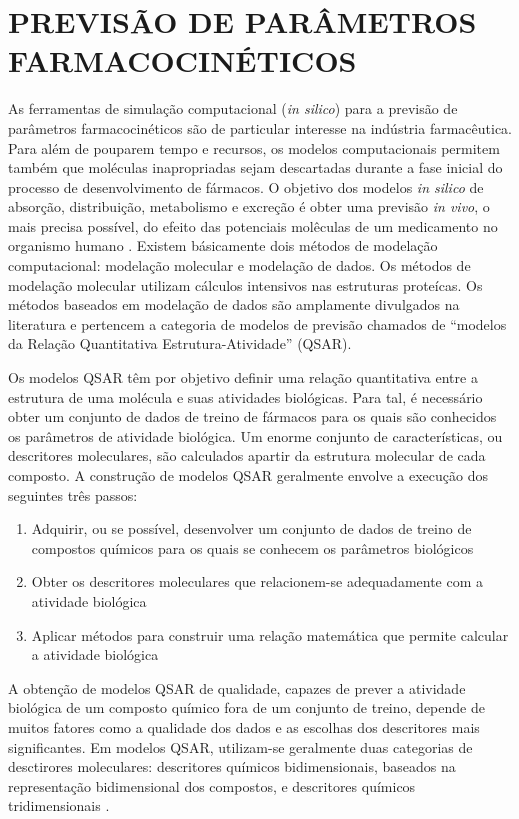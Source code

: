 \section{PREVISÃO DE PARÂMETROS FARMACOCINÉTICOS}
\label{sec:3previsao}

As ferramentas de simulação computacional (\emph{in silico}) para a previsão de parâmetros farmacocinéticos são de particular interesse na
indústria farmacêutica. Para além de pouparem tempo e recursos, os modelos computacionais permitem também que moléculas inapropriadas
sejam descartadas durante a fase inicial do processo de desenvolvimento de fármacos. O objetivo dos modelos \emph{in silico} de absorção, distribuição,
metabolismo e excreção é obter uma previsão \emph{in vivo}, o mais precisa possível, do efeito das potenciais molêculas de um medicamento no 
organismo humano \citep{waterbeemd2003,madan2012prediction}. Existem básicamente dois métodos de modelação computacional: 
modelação molecular e modelação de dados. Os métodos de modelação molecular 
utilizam cálculos intensivos nas estruturas proteícas. Os métodos baseados em modelação de dados são amplamente divulgados na literatura e 
pertencem a categoria de modelos de previsão chamados de ``modelos da Relação Quantitativa Estrutura-Atividade'' (\ac{QSAR}).

Os modelos \ac{QSAR} têm por objetivo definir uma relação quantitativa entre a estrutura de uma molécula e suas atividades biológicas.
Para tal, é necessário obter um conjunto de dados de treino de fármacos para os quais são conhecidos os parâmetros de atividade biológica.
Um enorme conjunto de características, ou descritores moleculares, são calculados apartir da estrutura molecular de cada composto. A construção de
modelos \ac{QSAR} geralmente envolve a execução dos seguintes três passos:
\begin{enumerate}
  \item {Adquirir, ou se possível, desenvolver um conjunto de dados de treino de compostos químicos para os quais se conhecem os 
  parâmetros biológicos}
  \item {Obter os descritores moleculares que relacionem-se adequadamente com a atividade biológica}
  \item {Aplicar métodos para construir uma relação matemática que permite calcular a atividade biológica}
\end{enumerate}

A obtenção de modelos \ac{QSAR} de qualidade, capazes de prever a atividade biológica de um composto químico fora de um conjunto de treino, depende
de muitos fatores como a qualidade dos dados e as escolhas dos descritores mais significantes. Em modelos \ac{QSAR}, utilizam-se geralmente duas 
categorias de desctirores moleculares: descritores químicos bidimensionais, baseados na representação bidimensional dos compostos, e descritores 
químicos tridimensionais \citep{todeschini2000handbook}.


